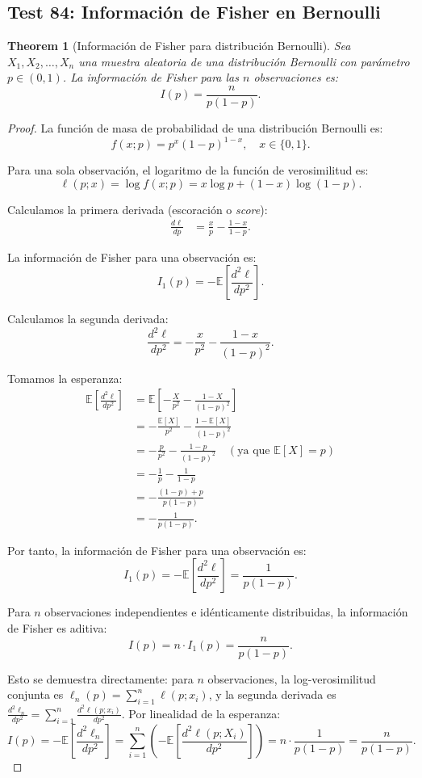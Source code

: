 \documentclass[11pt,a4paper]{article}
\theoremstyle{plain}
\newtheorem{theorem}{Theorem}[section]
\theoremstyle{definition}
\begin{document}
\subsection{Test 84: Información de Fisher en Bernoulli}

\begin{theorem}[Información de Fisher para distribución Bernoulli]
Sea $X_1, X_2, \ldots, X_n$ una muestra aleatoria de una distribución Bernoulli con parámetro $p \in (0,1)$. La información de Fisher para las $n$ observaciones es:
\[
I(p) = \frac{n}{p(1-p)}.
\]
\end{theorem}

\begin{proof}
La función de masa de probabilidad de una distribución Bernoulli es:
\[
f(x; p) = p^x (1-p)^{1-x}, \quad x \in \{0, 1\}.
\]

Para una sola observación, el logaritmo de la función de verosimilitud es:
\[
\ell(p; x) = \log f(x; p) = x \log p + (1-x) \log(1-p).
\]

Calculamos la primera derivada (escoración o \textit{score}):
\begin{align*}
\frac{d\ell}{dp} &= \frac{x}{p} - \frac{1-x}{1-p}.
\end{align*}

La información de Fisher para una observación es:
\[
I_1(p) = -\mathbb{E}\left[\frac{d^2\ell}{dp^2}\right].
\]

Calculamos la segunda derivada:
\[
\frac{d^2\ell}{dp^2} = -\frac{x}{p^2} - \frac{1-x}{(1-p)^2}.
\]

Tomamos la esperanza:
\begin{align*}
\mathbb{E}\left[\frac{d^2\ell}{dp^2}\right] &= \mathbb{E}\left[-\frac{X}{p^2} - \frac{1-X}{(1-p)^2}\right] \\
&= -\frac{\mathbb{E}[X]}{p^2} - \frac{1 - \mathbb{E}[X]}{(1-p)^2} \\
&= -\frac{p}{p^2} - \frac{1-p}{(1-p)^2} \quad (\text{ya que } \mathbb{E}[X] = p) \\
&= -\frac{1}{p} - \frac{1}{1-p} \\
&= -\frac{(1-p) + p}{p(1-p)} \\
&= -\frac{1}{p(1-p)}.
\end{align*}

Por tanto, la información de Fisher para una observación es:
\[
I_1(p) = -\mathbb{E}\left[\frac{d^2\ell}{dp^2}\right] = \frac{1}{p(1-p)}.
\]

Para $n$ observaciones independientes e idénticamente distribuidas, la información de Fisher es aditiva:
\[
I(p) = n \cdot I_1(p) = \frac{n}{p(1-p)}.
\]

Esto se demuestra directamente: para $n$ observaciones, la log-verosimilitud conjunta es $\ell_n(p) = \sum_{i=1}^{n} \ell(p; x_i)$, y la segunda derivada es $\frac{d^2\ell_n}{dp^2} = \sum_{i=1}^{n} \frac{d^2\ell(p; x_i)}{dp^2}$. Por linealidad de la esperanza:
\[
I(p) = -\mathbb{E}\left[\frac{d^2\ell_n}{dp^2}\right] = \sum_{i=1}^{n} \left(-\mathbb{E}\left[\frac{d^2\ell(p; X_i)}{dp^2}\right]\right) = n \cdot \frac{1}{p(1-p)} = \frac{n}{p(1-p)}.
\]
\end{proof}
\end{document}

